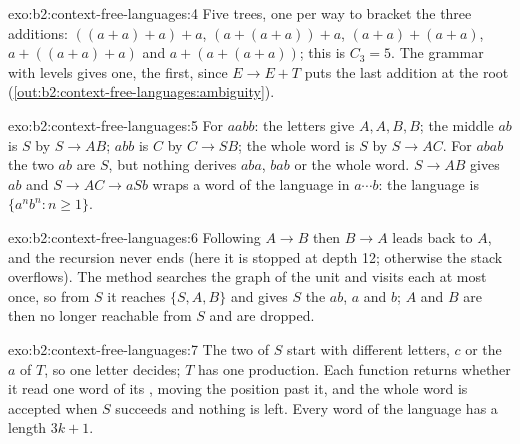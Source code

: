 \begin{solution}{exo:b2:context-free-languages:4}
Five trees, one per way to bracket the three additions: $((a + a) + a) + a$, $(a + (a + a)) + a$, $(a + a) + (a + a)$,
$a + ((a + a) + a)$ and $a + (a + (a + a))$; this is $C_3 = 5$. The grammar with levels gives one, the first, since $E
\to E + T$ puts the last addition at the root (\cref{out:b2:context-free-languages:ambiguity}).
\end{solution}

\begin{solution}{exo:b2:context-free-languages:5}
For $aabb$: the letters give $A, A, B, B$; the middle $ab$ is $S$ by $S \to AB$; $abb$ is $C$ by $C \to SB$; the whole
word is $S$ by $S \to AC$. For $abab$ the two $ab$ are $S$, but nothing derives $aba$, $bab$ or the whole word. $S \to
AB$ gives $ab$ and $S \to AC \to aSb$ wraps a word of the language in $a \cdots b$: the language is $\{a^nb^n : n \ge
1\}$.
\end{solution}

\begin{solution}{exo:b2:context-free-languages:6}
Following $A \to B$ then $B \to A$ leads back to $A$, and the recursion never ends (here it is stopped at depth 12;
otherwise the stack overflows). The method searches the graph of the unit  and visits each  at
most once, so from $S$ it reaches $\{S, A, B\}$ and gives $S$ the  $ab$, $a$ and $b$; $A$ and $B$ are then no
longer reachable from $S$ and are dropped.
\end{solution}

\begin{solution}{exo:b2:context-free-languages:7}
The two  of $S$ start with different letters, $c$ or the $a$ of $T$, so one letter decides; $T$ has one
production. Each function returns whether it read one word of its , moving the position past it, and the
whole word is accepted when $S$ succeeds and nothing is left. Every word of the language has a length $3k + 1$.
\end{solution}

